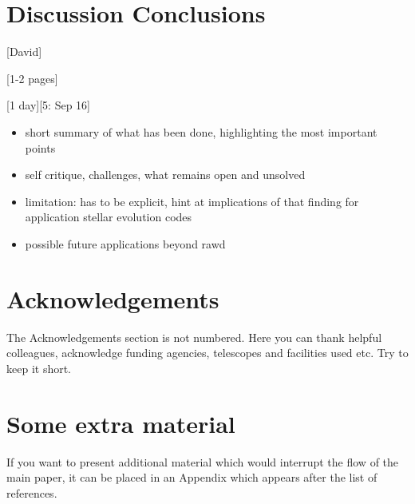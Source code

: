 \documentclass[fleqn,usenatbib]{mnras}
\begin{document}
\section{Discussion Conclusions}

[David]

[1-2 pages]

[1 day][5: Sep 16]

\begin{itemize}
\item short summary of what has been done, highlighting the most important points
\item self critique, challenges, what remains open and unsolved
\item limitation: has to be explicit, hint at implications of that finding for application stellar evolution codes
\item possible future applications beyond rawd
\end{itemize}

\section*{Acknowledgements}

The Acknowledgements section is not numbered. Here you can thank helpful
colleagues, acknowledge funding agencies, telescopes and facilities used etc.
Try to keep it short.










\appendix

\section{Some extra material}

If you want to present additional material which would interrupt the
flow of the main paper, it can be placed in an Appendix which appears
after the list of references.



\bsp	%
\label{lastpage}
\end{document}
